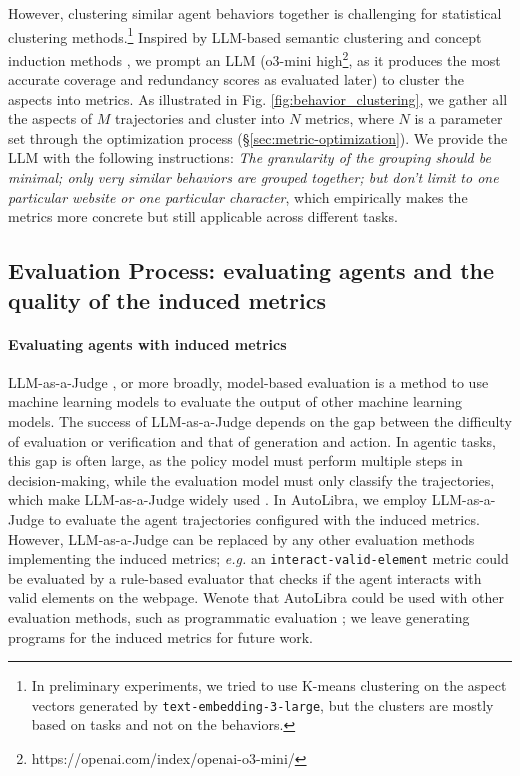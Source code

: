 However, clustering similar agent behaviors together is challenging for statistical
clustering methods.\footnote{ In preliminary experiments, we tried to use K-means
	clustering on the aspect vectors generated by \texttt{text-embedding-3-large},
	but the clusters are mostly based on tasks and not on the behaviors. } Inspired by
LLM-based semantic clustering and concept induction methods \citet{viswanathan2024large,lam2024concept},
we prompt an LLM (o3-mini high\footnote{https://openai.com/index/openai-o3-mini/},
as it produces the most accurate coverage and redundancy scores as evaluated
later) to cluster the aspects into metrics. As illustrated in Fig. \ref{fig:behavior_clustering},
we gather all the aspects of $M$ trajectories and cluster into $N$ metrics, where
$N$ is a parameter set through the optimization process (\S\ref{sec:metric-optimization}).
We provide the LLM with the following instructions: \emph{The granularity of the
	grouping should be minimal; only very similar behaviors are grouped together;
	but don't limit to one particular website or one particular character}, which
empirically makes the metrics more concrete but still applicable across
different tasks.

\subsection{Evaluation Process: evaluating agents and the quality of the induced
	metrics}
\label{sec:evaluation_process}

\paragraph{Evaluating agents with induced metrics}
LLM-as-a-Judge \citep{zheng2023judging}, or more broadly, model-based evaluation
\citep{zhang2019bertscore,celikyilmaz2021evaluationtextgenerationsurvey} is a
method to use machine learning models to evaluate the output of other machine
learning models. The success of LLM-as-a-Judge depends on the gap between the difficulty
of evaluation or verification and that of generation and action. In agentic
tasks, this gap is often large, as the policy model must perform multiple steps
in decision-making, while the evaluation model must only classify the trajectories,
which make LLM-as-a-Judge widely used \citep{zhouwebarena,he2024webvoyager,zhousotopia}.
In AutoLibra, we employ LLM-as-a-Judge to evaluate the agent trajectories configured
with the induced metrics. However, LLM-as-a-Judge can be replaced by any other evaluation
methods implementing the induced metrics; \emph{e.g.} an \texttt{interact-valid-element}
metric could be evaluated by a rule-based evaluator that checks if the agent
interacts with valid elements on the webpage. Wenote that AutoLibra could be used
with other evaluation methods, such as programmatic evaluation \citep{maeureka};
we leave generating programs for the induced metrics for future work.

